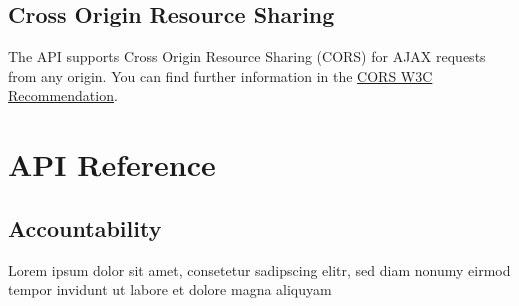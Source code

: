 \documentclass[letterpaper,10pt,english]{sphinxmanual}
\begin{document}

\begin{sphinxVerbatim}[commandchars=\\\{\}]
  
 

\PYG{p}{[}
         
         
         
         
\PYG{p}{]}
\end{sphinxVerbatim}


\subsection{Cross Origin Resource Sharing}
\label{\detokenize{usage:cross-origin-resource-sharing}}
The API supports Cross Origin Resource Sharing (CORS) for AJAX requests from any origin. You can find further information in the \href{https://www.w3.org/TR/cors/}{CORS W3C Recommendation}.


\section{API Reference}
\label{\detokenize{resources/index::doc}}\label{\detokenize{resources/index:api-reference}}

\subsection{Accountability}
\label{\detokenize{resources/accountability::doc}}\label{\detokenize{resources/accountability:accountability}}
Lorem ipsum dolor sit amet, consetetur sadipscing elitr, sed diam nonumy eirmod tempor invidunt ut labore et dolore magna aliquyam
\end{document}
